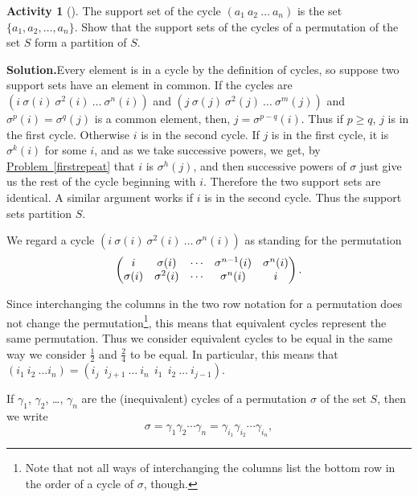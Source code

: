 \documentclass[10pt,]{book}
\theoremstyle{plain}
\theoremstyle{definition}
\newtheorem{activity}[project]{Activity}
\numberwithin{equation}{chapter}
\newcommand{\amp}{&}
\begin{document}
\begin{activity}[]\label{cyclepartition}
The support set of the cycle \((a_1\ a_2\ \ldots\ a_n)\) is the set \(\{a_1,a_2,\ldots,a_n\}\). Show that the support sets of the cycles of a permutation of the set \(S\) form a partition of \(S\).%
\par\medskip\noindent%
\textbf{Solution.}\quad Every element is in a cycle by the definition of cycles, so suppose two support sets have an element in common. If the cycles are \((i\
\sigma(i)\
\sigma^2(i)\ \ldots\ \sigma^n(i))\) and \((j\
\sigma(j)\
\sigma^2(j)\ \ldots\ \sigma^m(j))\) and \(\sigma^p(i) =\sigma^q(j)\) is a common element, then, \(j=\sigma^{p-q}(i)\). Thus if \(p\ge q\), \(j\) is in the first cycle. Otherwise \(i\) is in the second cycle. If \(j\) is in the first cycle, it is \(\sigma^k(i)\) for some \(i\), and as we take successive powers, we get, by \hyperref[firstrepeat]{Problem~\ref{firstrepeat}} that \(i\) is \(\sigma^h(j)\), and then successive powers of \(\sigma\) just give us the rest of the cycle beginning with \(i\). Therefore the two support sets are identical. A similar argument works if \(i\) is in the second cycle. Thus the support sets partition \(S\).%
\end{activity}
We regard a cycle \((i\
\sigma(i)\
\sigma^2(i)\ \ldots\ \sigma^n(i))\) as standing for the permutation%
\begin{equation*}
\begin{pmatrix}i\amp
\sigma(i)\amp
\cdots\amp \sigma^{n-1}(i)\amp \sigma^n(i)\cr
\sigma(i)\amp
\sigma^2(i)\amp \cdots\amp \sigma^n(i)\amp i
\end{pmatrix} .
\end{equation*}
%
\par
Since interchanging the columns in the two row notation for a permutation does not change the permutation\footnote{Note that not all ways of interchanging the columns list the bottom row in the order of a cycle of \(\sigma\), though.\label{fn-20}}, this means that equivalent cycles represent the same permutation. Thus we consider equivalent cycles to be equal in the same way we consider \(\frac{1}{2}\) and \(\frac{2}{ 4}\) to be equal. In particular, this means that \((i_1\ i_2\
\ldots i_n) = (i_j\ \ i_{j+1}\ \ldots\ i_n\ \ i_1\ \ i_2\ \ldots\ i_{j-1})\).%
\par
If \(\gamma_1\), \(\gamma_2\), \dots{}, \(\gamma_n\) are the (inequivalent) cycles of a permutation \(\sigma\) of the set \(S\), then we write%
\begin{equation*}
\sigma = \gamma_1\gamma_2\cdots\gamma_n= \gamma_{i_1}\gamma_{i_2}
\cdots \gamma_{i_n},
\end{equation*}
\end{document}
